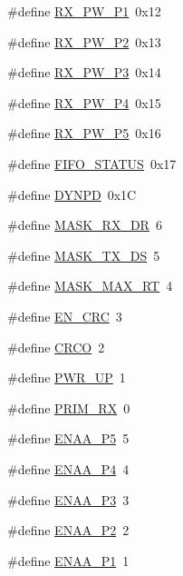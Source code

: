 \begin{DoxyCompactItemize}
\item 
\#define \hyperlink{a00013_aa260ec97512905cec17f8ade82bc550d}{R\-X\-\_\-\-P\-W\-\_\-\-P1}~0x12
\item 
\#define \hyperlink{a00013_a38a4904a52517c8d339c689230a6567d}{R\-X\-\_\-\-P\-W\-\_\-\-P2}~0x13
\item 
\#define \hyperlink{a00013_a44bdf6946c1ae047ea2a2c981244d4d8}{R\-X\-\_\-\-P\-W\-\_\-\-P3}~0x14
\item 
\#define \hyperlink{a00013_a5cdda00ab52df1537b6b5d61ef88ba8f}{R\-X\-\_\-\-P\-W\-\_\-\-P4}~0x15
\item 
\#define \hyperlink{a00013_a9ce52902779e18d4fed3685b0f8be582}{R\-X\-\_\-\-P\-W\-\_\-\-P5}~0x16
\item 
\#define \hyperlink{a00013_a9e5c9878194f462bf7a46ca8a7b8f9d2}{F\-I\-F\-O\-\_\-\-S\-T\-A\-T\-U\-S}~0x17
\item 
\#define \hyperlink{a00013_ae79cde384e0b6a5549efb001589a79ec}{D\-Y\-N\-P\-D}~0x1\-C
\item 
\#define \hyperlink{a00013_a5f30d66a7a448dc83fd695dbd3efbe31}{M\-A\-S\-K\-\_\-\-R\-X\-\_\-\-D\-R}~6
\item 
\#define \hyperlink{a00013_ad5f819a0030605463504bd2599579b4c}{M\-A\-S\-K\-\_\-\-T\-X\-\_\-\-D\-S}~5
\item 
\#define \hyperlink{a00013_a13e9f541027a36c23211d6c8f3b33a92}{M\-A\-S\-K\-\_\-\-M\-A\-X\-\_\-\-R\-T}~4
\item 
\#define \hyperlink{a00013_aece57618cf42f6b1b520341ef19a66f8}{E\-N\-\_\-\-C\-R\-C}~3
\item 
\#define \hyperlink{a00013_a253dd73b17f0ea7f71e55f52e796836a}{C\-R\-C\-O}~2
\item 
\#define \hyperlink{a00013_af0dbd9e4c17ba0db357fcb2cedd4aa6d}{P\-W\-R\-\_\-\-U\-P}~1
\item 
\#define \hyperlink{a00013_a0b4d92f3ecccb150d4cb1cb5d0f9d4e6}{P\-R\-I\-M\-\_\-\-R\-X}~0
\item 
\#define \hyperlink{a00013_ae28c4601af8b2f85827386fe9a27f9fa}{E\-N\-A\-A\-\_\-\-P5}~5
\item 
\#define \hyperlink{a00013_a3b5bebd442d3a0351e85100a69244810}{E\-N\-A\-A\-\_\-\-P4}~4
\item 
\#define \hyperlink{a00013_aade4fe5e884e4f5868daf2c706d72f5e}{E\-N\-A\-A\-\_\-\-P3}~3
\item 
\#define \hyperlink{a00013_a8b3d7771adbc5bc2bd8846f00aa39a5a}{E\-N\-A\-A\-\_\-\-P2}~2
\item 
\#define \hyperlink{a00013_adfa71d5ebb7107d673674bb10279d9c6}{E\-N\-A\-A\-\_\-\-P1}~1

\end{DoxyCompactItemize}
